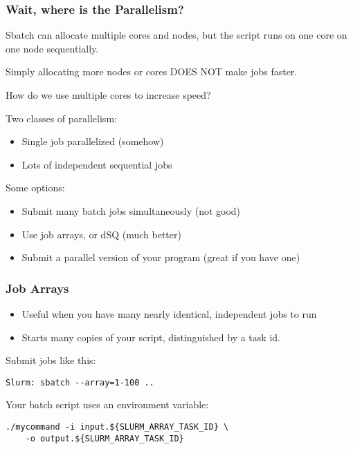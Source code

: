 \documentclass[10pt]{beamer}
\begin{document}
\begin{frame}[fragile]
\frametitle{Wait, where is the Parallelism?}

Sbatch can allocate multiple cores and nodes, but the script runs on one core on one node sequentially.  

Simply allocating more nodes or cores DOES NOT make jobs faster.

How do we use multiple cores to increase speed?

Two classes of parallelism:
\begin{itemize}
\item Single job parallelized (somehow)
\item Lots of independent sequential jobs
\end{itemize}

Some options:
\begin{itemize}
\item Submit many batch jobs simultaneously (not good)
\item Use job arrays, or dSQ (much better)
\item Submit a parallel version of your program (great if you have one)
\end{itemize}

\end{frame}

\begin{frame}[fragile]
\frametitle{Job Arrays}

\begin{itemize}
\item Useful when you have many nearly identical, independent jobs to run
\item Starts many copies of your script, distinguished by a task id.
\end{itemize}

Submit jobs like this:
\begin{verbatim}
Slurm: sbatch --array=1-100 ..
\end{verbatim}

Your batch script uses an environment variable:
\begin{verbatim}
./mycommand -i input.${SLURM_ARRAY_TASK_ID} \
    -o output.${SLURM_ARRAY_TASK_ID}
\end{verbatim}
\end{frame}
\end{document}
